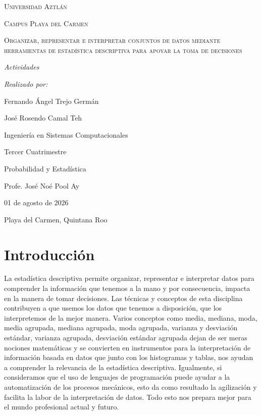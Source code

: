 \documentclass[12pt]{article}
\begin{document}
\begin{titlepage}
	\centering
	{\scshape\LARGE Universidad Aztlán \par}
	\vspace{1cm}
	{\scshape\Large Campus Playa del Carmen \par}
	\vspace{1.75cm}
	{\scshape\Huge Organizar, representar e interpretar conjuntos de datos mediante herramientas de estadística descriptiva para apoyar la toma de decisiones \par}
    \vfill
    {\itshape\Large Actividades \par}
	\vspace{2cm}
    {\itshape\Large Realizado por: \par}
    {\Large Fernando Ángel Trejo Germán \par}
	{\Large José Rosendo Camal Teh \par}
	\vfill
	{\Large Ingeniería en Sistemas Computacionales \par}
	{\Large Tercer Cuatrimestre \par}
	{\Large Probabilidad y Estadística \par}
	\vfill
	{\Large Profe. José Noé Pool Ay \par}
	\vfill
	{\Large 01 de agosto de 2026 \par}
	\vfill
	{\Large Playa del Carmen, Quintana Roo \par}
\end{titlepage}

\tableofcontents
\listoffigures
\listoftables
\lstlistoflistings
\newpage


\section*{\centering Introducción}

La estadística descriptiva permite organizar, representar e interpretar datos para comprender la información que tenemos a la mano y por consecuencia, impacta en la manera de tomar decisiones. Las técnicas y conceptos de esta disciplina contribuyen a que usemos los datos que tenemos a disposición, que los interpretemos de la mejor manera. Varios conceptos como media, mediana, moda, media agrupada, mediana agrupada, moda agrupada, varianza y desviación estándar, varianza agrupada, desviación estándar agrupada dejan de ser meras nociones matemáticas y se convierten en instrumentos para la interpretación de información basada en datos que junto con los histogramas y tablas, nos ayudan a comprender la relevancia de la estadística descriptiva. Igualmente, si consideramos que el uso de lenguajes de programación puede ayudar a la automatización de los procesos mecánicos, esto da como resultado la agilización y facilita la labor de la interpretación de datos. Todo esto nos prepara mejor para el mundo profesional actual y futuro.
\end{document}
